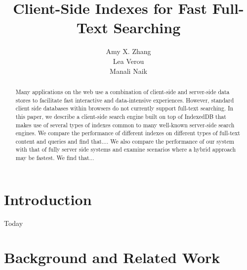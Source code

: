 \documentclass{vldb}
\begin{document}

\title{Client-Side Indexes for Fast Full-Text Searching}




\author{
\alignauthor
Amy X. Zhang\\
\alignauthor Lea Verou\\
\alignauthor Manali Naik\\
}

\maketitle

\begin{abstract}

Many applications on the web use a combination of client-side and server-side data stores to facilitate fast interactive and data-intensive experiences. 
However, standard client side databases within browsers do not currently support full-text searching. 
In this paper, we describe a client-side search engine built on top of IndexedDB that makes use of several types of indexes common to many well-known server-side search engines.
We compare the performance of different indexes on different types of full-text content and queries and find that....
We also compare the performance of our system with that of fully server side systems and examine scenarios where a hybrid approach may be fastest. We find that...

\end{abstract}

\section{Introduction}

Today


\section{Background and Related Work}
\end{document}
